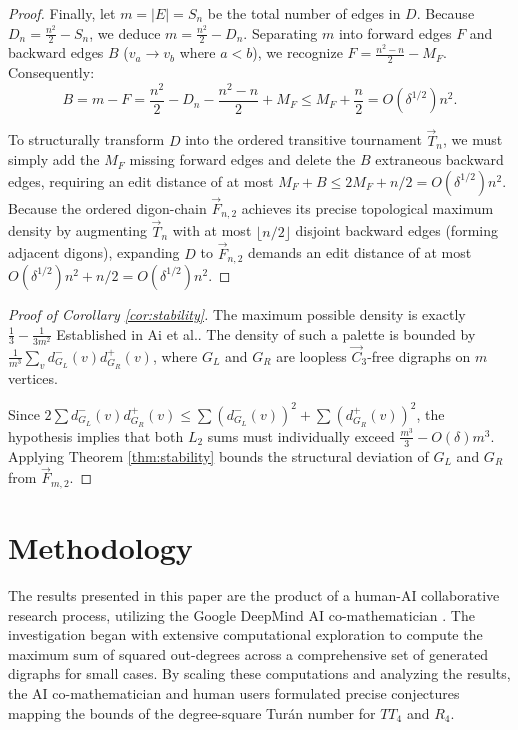 \documentclass[a4paper]{amsart}
\begin{document}
\begin{proof}
Finally, let $m = |E| = S_n$ be the total number of edges in $D$.
Because $D_n = \frac{n^2}{2} - S_n$,
we deduce $m = \frac{n^2}{2} - D_n$. 
Separating $m$ into forward edges $F$ and backward edges $B$ ($v_a \to v_b$ where $a < b$),
we recognize $F = \frac{n^2 - n}{2} - M_F$.
Consequently:
\begin{equation}
B = m - F = \frac{n^2}{2} - D_n - \frac{n^2 - n}{2} + M_F \le M_F + \frac{n}{2} = O(\delta^{1/2})n^2.
\end{equation}

To structurally transform $D$ into the ordered transitive tournament $\vec{T}_n$,
we must simply add the $M_F$ missing forward edges and delete the $B$ extraneous backward edges,
requiring an edit distance of at most $M_F + B \le 2M_F + n/2 = O(\delta^{1/2})n^2$. 
Because the ordered digon-chain $\vec{F}_{n,2}$ achieves its precise topological maximum density by augmenting $\vec{T}_n$ with at most $\lfloor n/2 \rfloor$ disjoint backward edges (forming adjacent digons),
expanding $D$ to $\vec{F}_{n,2}$ demands an edit distance of at most $O(\delta^{1/2})n^2 + n/2 = O(\delta^{1/2})n^2$. 
\end{proof}

\begin{proof}[Proof of Corollary \ref{cor:stability}]
The maximum possible density is exactly $\frac{1}{3} - \frac{1}{3m^2}$ Established in Ai et al..
The density of such a palette is bounded by $\frac{1}{m^3} \sum_{v} d^-_{G_L}(v) d^+_{G_R}(v)$,
where $G_L$ and $G_R$ are loopless $\vec{C}_3$-free digraphs on $m$ vertices.


Since $2\sum d^-_{G_L}(v) d^+_{G_R}(v) \le \sum (d^-_{G_L}(v))^2 + \sum (d^+_{G_R}(v))^2$,
the hypothesis implies that both $L_2$ sums must individually exceed $\frac{m^3}{3} - O(\delta) m^3$.
Applying Theorem \ref{thm:stability} bounds the structural deviation of $G_L$ and $G_R$ from $\vec{F}_{m,2}$.
\end{proof}



\section{Methodology}

The results presented in this paper are the product of a human-AI collaborative research process, utilizing the Google DeepMind AI co-mathematician \cite{zheng2026}. The investigation began with extensive computational exploration to compute the maximum sum of squared out-degrees across a comprehensive set of generated digraphs for small cases. By scaling these computations and analyzing the results, the AI co-mathematician and human users formulated precise conjectures mapping the bounds of the degree-square Tur\'an number for $TT_4$ and $R_4$.
\end{document}
